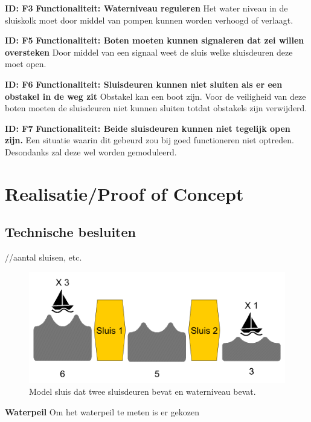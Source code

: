 \documentclass{article}
\begin{document}
\textbf{ID: F3} \newline
\textbf{Functionaliteit: Waterniveau reguleren} \newline
Het water niveau in de sluiskolk moet door middel van pompen kunnen worden verhoogd of verlaagt. \newline

\textbf{ID: F5} \newline
\textbf{Functionaliteit: Boten moeten kunnen signaleren dat zei willen oversteken} \newline
Door middel van een signaal weet de sluis welke sluisdeuren deze moet open. \newline

\textbf{ID: F6} \newline
\textbf{Functionaliteit: Sluisdeuren kunnen niet sluiten als er een obstakel in de weg zit} \newline
Obstakel kan een boot zijn. Voor de veiligheid van deze boten moeten de sluisdeuren niet kunnen sluiten totdat obstakels zijn verwijderd.  \newline

\textbf{ID: F7} \newline
\textbf{Functionaliteit: Beide sluisdeuren kunnen niet tegelijk open zijn.} \newline
Een situatie waarin dit gebeurd zou bij goed functioneren niet optreden. Desondanks zal deze wel worden gemoduleerd. \newline


\section{Realisatie/Proof of Concept}

\subsection{Technische besluiten}
//aantal sluisen, etc.
\begin{figure}[!h]
	\centering
	\includegraphics[width=\textwidth]{images/sluis_model.png}
    \caption{Model sluis dat twee sluisdeuren bevat en waterniveau bevat.}
\end{figure} \newline
\textbf{Waterpeil}\newline
Om het waterpeil te meten is er gekozen
\end{document}
